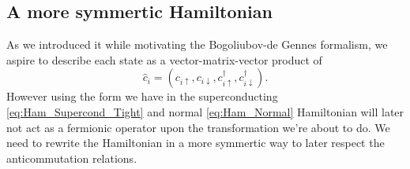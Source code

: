 \documentclass[../main.tex]{subfile}
\begin{document}
\subsection{A more symmertic Hamiltonian}
As we introduced it while motivating the Bogoliubov-de Gennes formalism, we aspire to describe each state as a vector-matrix-vector product of
\[
    \hat{c}_i = \left(c_{i\uparrow}, c_{i\downarrow},c_{i\uparrow}^{\dagger}, c_{i\downarrow}^{\dagger}\right).
\]
However using the form we have in the superconducting \ref{eq:Ham_Supercond_Tight} and normal \ref{eq:Ham_Normal} 
Hamiltonian will later not act as a fermionic operator upon the transformation we're about to
do. We need to rewrite the Hamiltonian in a more symmertic way to later respect the anticommutation relations.\\
\end{document}
